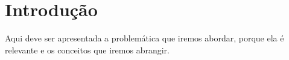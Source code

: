 \section{Introdução}

Aqui deve ser apresentada a problemática que iremos abordar, porque ela é relevante e os conceitos que iremos abrangir.
